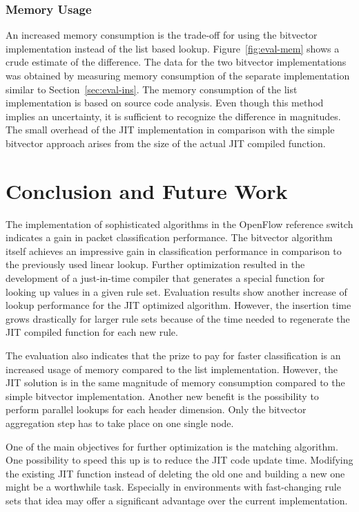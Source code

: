 \documentclass[conference]{IEEEtran}
\begin{document}
\subsubsection{Memory Usage}
An increased memory consumption is the trade-off for using the bitvector implementation
instead of the list based lookup.
Figure~\ref{fig:eval-mem} shows a crude estimate of the difference.
The data for the two bitvector implementations was obtained by measuring memory consumption of the separate implementation
similar to Section~\ref{sec:eval-ins}.
The memory consumption of the list implementation is based on source code analysis.
Even though this method implies an uncertainty, it is sufficient to recognize the difference in magnitudes.
The small overhead of the JIT implementation in comparison with the simple bitvector approach
arises from the size of the actual JIT compiled function.

\section{Conclusion and Future Work}
The implementation of sophisticated algorithms in the OpenFlow reference switch indicates a gain in packet classification performance.
The bitvector algorithm itself achieves an impressive gain in classification 
performance in comparison to the previously used linear lookup.
Further optimization resulted in the development of a just-in-time compiler 
that generates a special function for looking up values in a given rule set.
Evaluation results show another increase of lookup performance for the JIT optimized algorithm.
However, the insertion time grows drastically for larger rule sets because 
of the time needed to regenerate the JIT compiled function for each new rule.

The evaluation also indicates that the prize to pay for faster classification 
is an increased usage of memory compared to the list implementation.
However, the JIT solution is in the same magnitude of memory consumption 
compared to the simple bitvector implementation. 
Another new benefit is the possibility to perform parallel lookups for each header dimension.
Only the bitvector aggregation step has to take place on one single node.

One of the main objectives for further optimization is the matching algorithm.
One possibility to speed this up is to reduce the JIT code update time.
Modifying the existing JIT function instead of deleting the old one and building 
a new one might be a worthwhile task.
Especially in environments with fast-changing rule sets that idea may offer 
a significant advantage over the current implementation.
\end{document}
